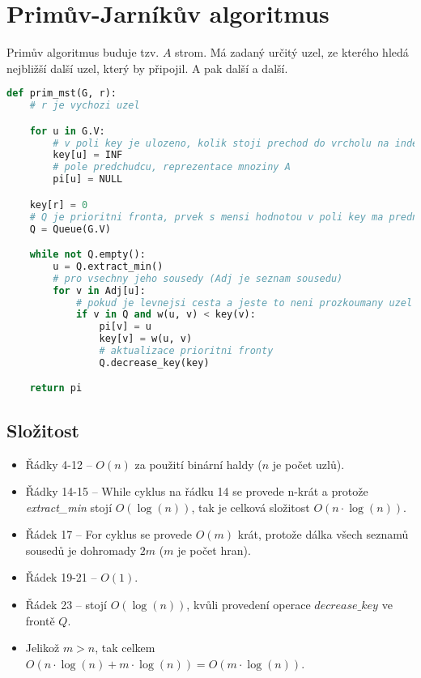 
\section{Primův-Jarníkův algoritmus}

Primův algoritmus buduje tzv. $A$ strom. Má zadaný určitý uzel, ze kterého hledá nejbližší další uzel, který by připojil. A pak další a další.

\bigskip\noindent\begin{minipage}{\linewidth}
\begin{lstlisting}[language=Python, caption={Primův algoritmus.}]
def prim_mst(G, r):
    # r je vychozi uzel

    for u in G.V:
        # v poli key je ulozeno, kolik stoji prechod do vrcholu na indexu
        key[u] = INF
        # pole predchudcu, reprezentace mnoziny A
        pi[u] = NULL

    key[r] = 0
    # Q je prioritni fronta, prvek s mensi hodnotou v poli key ma prednost
    Q = Queue(G.V)

    while not Q.empty():
        u = Q.extract_min()
        # pro vsechny jeho sousedy (Adj je seznam sousedu)
        for v in Adj[u]:
            # pokud je levnejsi cesta a jeste to neni prozkoumany uzel
            if v in Q and w(u, v) < key(v):
                pi[v] = u
                key[v] = w(u, v)
                # aktualizace prioritni fronty
                Q.decrease_key(key)

    return pi
\end{lstlisting}
\end{minipage}

\subsection{Složitost}

\begin{itemize}
    \item Řádky 4-12 -- $O(n)$ za použití binární haldy ($n$ je počet uzlů).
    \item Řádky 14-15 -- While cyklus na řádku 14 se provede n-krát a protože \textit{extract\_min} stojí $O(\log(n))$, tak je celková složitost $O(n \cdot \log(n))$.
    \item Řádek 17 -- For cyklus se provede $O(m)$ krát, protože dálka všech seznamů sousedů je dohromady $2m$ ($m$ je počet hran).
    \item Řádek 19-21 -- $O(1)$.
    \item Řádek 23 -- stojí $O(\log(n))$, kvůli provedení operace $decrease\_key$ ve frontě $Q$.
    \item Jelikož $m > n$, tak celkem $O(n \cdot \log(n) + m \cdot \log(n)) = O(m \cdot \log(n))$.
\end{itemize}

